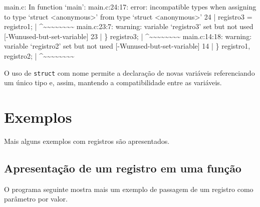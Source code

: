 \documentclass[
  11pt,
  a4paper,
]{scrbook}
\newenvironment{Shaded}{\begin{snugshade}}{\end{snugshade}}
\newcommand{\NormalTok}[1]{#1}
\begin{document}
\begin{Shaded}
\begin{Highlighting}[]
\NormalTok{main.c: In function ‘main’:}
\NormalTok{main.c:24:17: error: incompatible types when assigning to type ‘struct }
\NormalTok{\textless{}anonymous\textgreater{}’ from type ‘struct \textless{}anonymous\textgreater{}’}
\NormalTok{   24 |     registro3 = registro1;}
\NormalTok{      |                 \^{}\textasciitilde{}\textasciitilde{}\textasciitilde{}\textasciitilde{}\textasciitilde{}\textasciitilde{}\textasciitilde{}\textasciitilde{}}
\NormalTok{main.c:23:7: warning: variable ‘registro3’ set but not used }
\NormalTok{[{-}Wunused{-}but{-}set{-}variable]}
\NormalTok{   23 |     \} registro3;}
\NormalTok{      |       \^{}\textasciitilde{}\textasciitilde{}\textasciitilde{}\textasciitilde{}\textasciitilde{}\textasciitilde{}\textasciitilde{}\textasciitilde{}}
\NormalTok{main.c:14:18: warning: variable ‘registro2’ set but not used }
\NormalTok{[{-}Wunused{-}but{-}set{-}variable]}
\NormalTok{   14 |     \} registro1, registro2;}
\NormalTok{      |                  \^{}\textasciitilde{}\textasciitilde{}\textasciitilde{}\textasciitilde{}\textasciitilde{}\textasciitilde{}\textasciitilde{}\textasciitilde{}}
\end{Highlighting}
\end{Shaded}

O uso de \texttt{struct} com nome permite a declaração de novas
variáveis referenciando um único tipo e, assim, mantendo a
compatibilidade entre as variáveis.

\section{Exemplos}\label{exemplos-5}

Mais alguns exemplos com registros são apresentados.

\subsection{Apresentação de um registro em uma
função}\label{apresentauxe7uxe3o-de-um-registro-em-uma-funuxe7uxe3o}

O programa seguinte mostra mais um exemplo de passagem de um registro
como parâmetro por valor.
\end{document}
